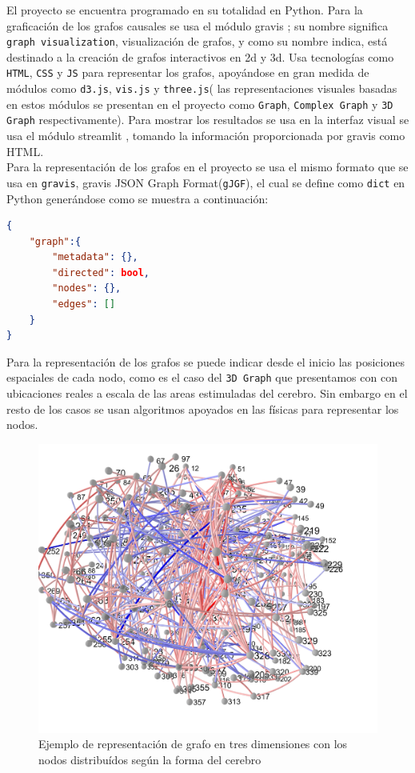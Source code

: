 \documentclass[a4paper,10pt,twocolumn]{article}
\begin{document}
El proyecto se encuentra programado en su totalidad en Python. Para la graficación de los grafos causales
se usa el módulo gravis \cite{gv}; su nombre significa \texttt{graph visualization}, visualización de grafos,
y como su nombre indica, está destinado a la creación de grafos interactivos en 2d y 3d.
Usa tecnologías como \texttt{HTML}, \texttt{CSS} y \texttt{JS} para representar los grafos, apoyándose en gran medida de
módulos como \texttt{d3.js}, \texttt{vis.js} y \texttt{three.js}( las representaciones visuales basadas en estos módulos
se presentan en el proyecto como \texttt{Graph}, \texttt{Complex Graph} y \texttt{3D Graph} respectivamente).
Para mostrar los resultados se usa en la interfaz visual se usa el módulo streamlit \cite{st}, tomando la información proporcionada por gravis como HTML.\\

Para la representación de los grafos en el proyecto se usa el mismo formato que se usa en \texttt{gravis}, gravis JSON Graph Format(\texttt{gJGF}),
el cual se define como \texttt{dict} en Python generándose como se muestra a continuación:

\begin{lstlisting}[language=json,firstnumber=1]
{
	"graph":{
		"metadata": {},
		"directed": bool,
		"nodes": {},
		"edges": []
	}	
}
\end{lstlisting}


Para la representación de los grafos se puede indicar desde el inicio las posiciones espaciales de cada nodo,
como es el caso del \texttt{3D Graph} que presentamos con con ubicaciones reales a escala de las areas estimuladas del cerebro.
Sin embargo en el resto de los casos se usan algoritmos apoyados en las físicas para representar los nodos.\\

\begin{figure}[h!]%
\includegraphics[scale=0.1]{3d_graph.jpg}
\caption{Ejemplo de representación de grafo en tres dimensiones con los nodos distribuídos según la forma del cerebro}
\end{figure}
\end{document}
